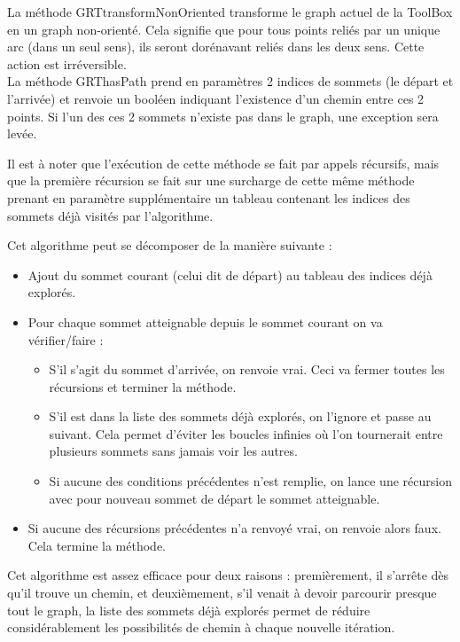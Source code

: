 		La méthode GRTtransformNonOriented transforme le graph actuel de la ToolBox en un graph non-orienté. Cela signifie que pour tous points reliés par un unique arc (dans un seul sens), ils seront dorénavant reliés dans les deux sens. Cette action est irréversible.\\
		
		La méthode GRThasPath prend en paramètres 2 indices de sommets (le départ et l'arrivée) et renvoie un booléen indiquant l'existence d'un chemin entre ces 2 points. Si l'un des ces 2 sommets n'existe pas dans le graph, une exception sera levée.
		
		Il est à noter que l'exécution de cette méthode se fait par appels récursifs, mais que la première récursion se fait sur une surcharge de cette même méthode prenant en paramètre supplémentaire un tableau contenant les indices des sommets déjà visités par l'algorithme.
		
		Cet algorithme peut se décomposer de la manière suivante :
		\begin{itemize}
			\item Ajout du sommet courant (celui dit de départ) au tableau des indices déjà explorés.
			\item Pour chaque sommet atteignable depuis le sommet courant on va vérifier/faire :
			\begin{itemize}
				\item S'il s'agit du sommet d'arrivée, on renvoie vrai. Ceci va fermer toutes les récursions et terminer la méthode.
				\item S'il est dans la liste des sommets déjà explorés, on l'ignore et passe au suivant. Cela permet d'éviter les boucles infinies où l'on tournerait entre plusieurs sommets sans jamais voir les autres.
				\item Si aucune des conditions précédentes n'est remplie, on lance une récursion avec pour nouveau sommet de départ le sommet atteignable.
			\end{itemize}
			\item Si aucune des récursions précédentes n'a renvoyé vrai, on renvoie alors faux. Cela termine la méthode.\\
		\end{itemize}
		Cet algorithme est assez efficace pour deux raisons : premièrement, il s'arrête dès qu'il trouve un chemin, et deuxièmement, s'il venait à devoir parcourir presque tout le graph, la liste des sommets déjà explorés permet de réduire considérablement les possibilités de chemin à chaque nouvelle itération.\\
		
